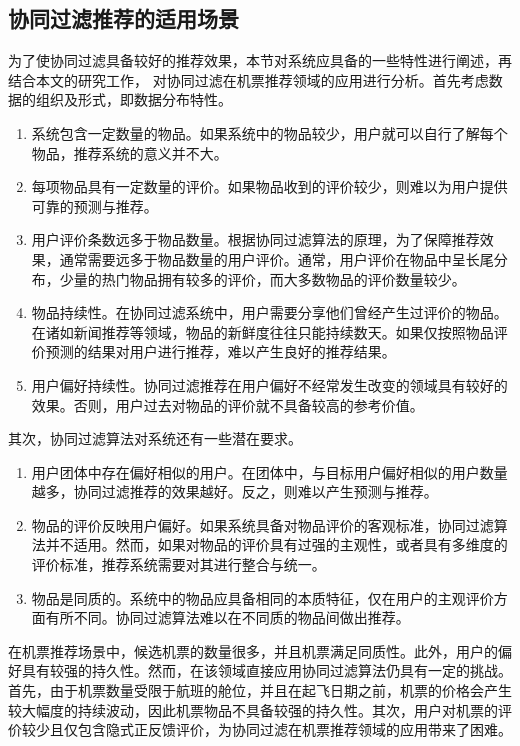 \subsection{协同过滤推荐的适用场景}

为了使协同过滤具备较好的推荐效果，本节对系统应具备的一些特性进行阐述，再结合本文的研究工作， 对协同过滤在机票推荐领域的应用进行分析。首先考虑数据的组织及形式，即数据分布特性。

\begin{enumerate}
  \item 系统包含一定数量的物品。如果系统中的物品较少，用户就可以自行了解每个物品，推荐系统的意义并不大。
  \item 每项物品具有一定数量的评价。如果物品收到的评价较少，则难以为用户提供可靠的预测与推荐。
  \item 用户评价条数远多于物品数量。根据协同过滤算法的原理，为了保障推荐效果，通常需要远多于物品数量的用户评价。通常，用户评价在物品中呈长尾分布，少量的热门物品拥有较多的评价，而大多数物品的评价数量较少。
  \item 物品持续性。在协同过滤系统中，用户需要分享他们曾经产生过评价的物品。在诸如新闻推荐等领域，物品的新鲜度往往只能持续数天。如果仅按照物品评价预测的结果对用户进行推荐，难以产生良好的推荐结果。
  \item 用户偏好持续性。协同过滤推荐在用户偏好不经常发生改变的领域具有较好的效果。否则，用户过去对物品的评价就不具备较高的参考价值。
\end{enumerate}

其次，协同过滤算法对系统还有一些潜在要求。

\begin{enumerate}
	\item 用户团体中存在偏好相似的用户。在团体中，与目标用户偏好相似的用户数量越多，协同过滤推荐的效果越好。反之，则难以产生预测与推荐。
	\item 物品的评价反映用户偏好。如果系统具备对物品评价的客观标准，协同过滤算法并不适用。然而，如果对物品的评价具有过强的主观性，或者具有多维度的评价标准，推荐系统需要对其进行整合与统一。
	\item 物品是同质的。系统中的物品应具备相同的本质特征，仅在用户的主观评价方面有所不同。协同过滤算法难以在不同质的物品间做出推荐。
\end{enumerate}

在机票推荐场景中，候选机票的数量很多，并且机票满足同质性。此外，用户的偏好具有较强的持久性。然而，在该领域直接应用协同过滤算法仍具有一定的挑战。首先，由于机票数量受限于航班的舱位，并且在起飞日期之前，机票的价格会产生较大幅度的持续波动，因此机票物品不具备较强的持久性。其次，用户对机票的评价较少且仅包含隐式正反馈评价，为协同过滤在机票推荐领域的应用带来了困难。

